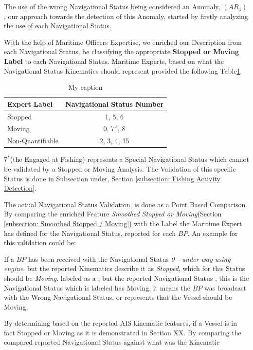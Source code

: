 The use of the wrong Navigational Status being considered an Anomaly, $(AR_4)$, our approach towards the detection of this Anomaly, started by firstly analyzing the use of each Navigational Status. 

With the help of Maritime Officers Expertise, we enriched our Description from each Navigational Status, be classifying the appropriate \textbf{Stopped or Moving Label} to each Navigational Status. Maritime Experts, based on what the Navigational Status Kinematics should represent provided the following
Table\ref{Table: AIS Status Moving or Stopped}.

\begin{table}[H]
\centering
\caption{My caption}
\label{Table: AIS Status Moving or Stopped}
\begin{tabular}{lc}
\hline
Expert Label     & Navigational Status Number \\ \hline
Stopped          & 1, 5, 6                    \\
Moving           & 0, 7*, 8                   \\
Non-Quantifiable & 2, 3, 4, 15                \\ \hline
\end{tabular}
\end{table}
$7^*$(the Engaged at Fishing) represents a Special Navigational Status which cannot be validated by a Stopped or Moving Analysis. The Validation of this specific Status is done in Subsection under, Section \ref{subsection: Fishing Activity Detection}.

The actual Navigational Status Validation, is done as a Point Based Comparison. By comparing the enriched Feature \textit{Smoothed Stopped or Moving}(Section \ref{subsection: Smoothed Stopped / Moving}) with the Label the Maritime Expert has defined for the Navigational Status, reported for each $BP$.
An example for this validation could be:

If a $BP$ has been received with the Navigational Status \textit{0 - under way using engine}, but the reported Kinematics describe it as \textit{Stopped}, which for this Status should be \textit{Moving}.
\iffalse
labeled as a , but the reported Navigational Status , this is the Navigational Status which is labeled has Moving, it means the $BP$ was broadcast with the Wrong Navigational Status, or represents that the Vessel should be Moving, 

By determining based on the reported AIS kinematic features, if a Vessel is in fact Stopped or Moving as it is demonstrated in Section XX. By comparing the compared reported Navigational Status against what was the Kinematic

